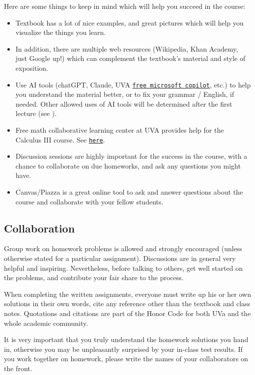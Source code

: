 \documentclass[oneside,11pt]{amsart}
\begin{document}
Here are some things to keep in mind which will help you succeed in the course:
\begin{itemize}
	\item Textbook has a lot of nice examples, and great pictures which will help you visualize the things you learn.
	\item In addition, there are multiple web resources (Wikipedia, Khan Academy, just Google up!) which can complement the textbook's material and style of exposition.
	\item Use AI tools (chatGPT, Claude, UVA \href{https://virginia.service-now.com/its?id=itsweb_kb_article&sys_id=dbe41947dbe3f91066d98f38139619db}{\textcolor{green!70!black}{\texttt{free microsoft copilot}}}, etc.) to help you understand the material better, or to fix your grammar / English, if needed. Other allowed uses of AI tools will be determined after the first lecture (see ).
	\item Free math collaborative learning center at UVA provides help for the Calculus III course. See \href{https://math.virginia.edu/undergraduate/MCLC/}{\textcolor{green!70!black}{\texttt{here}}}.
	\item 
	Discussion sessions are highly important for the success in the course, with a chance to collaborate on due homeworks, and ask any questions you might have.
	\item Canvas/Piazza is a great online tool to ask and answer questions about the course and collaborate with your fellow students.
\end{itemize}

\subsection{Collaboration}

Group work on homework problems is allowed and strongly encouraged (unless otherwise stated for a particular assignment). Discussions are in general very helpful and inspiring. Nevertheless, before talking to others, get well started on the problems, and contribute your fair share to the process. 

When completing the written assignments, everyone must write up his or her own solutions in their own words, cite any reference other than the textbook and class notes. Quotations and citations are part of the Honor Code for both UVa and the whole academic community. 

It is very important that you truly understand the homework solutions you hand in, otherwise you may be unpleasantly surprised by your in-class test results.
If you work together on homework, please write the names of your collaborators on the front.
\label{academic_integrity}
\end{document}
